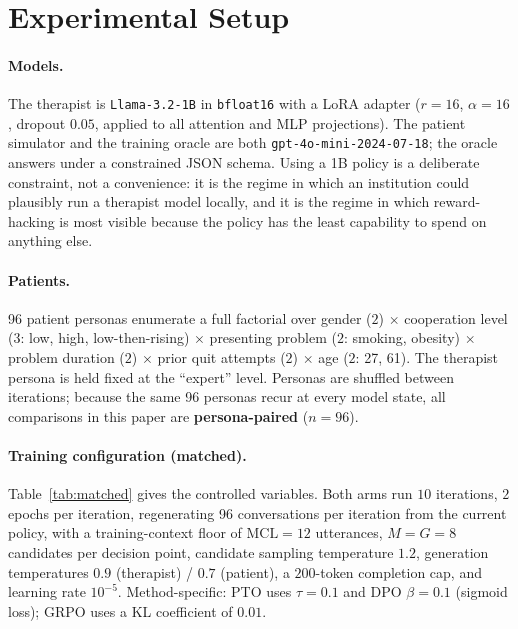 \section{Experimental Setup}
\label{sec:setup}

\paragraph{Models.}
The therapist is \texttt{Llama-3.2-1B} in \texttt{bfloat16} with a LoRA adapter
($r{=}16$, $\alpha{=}16$, dropout $0.05$, applied to all attention and MLP projections).
The patient simulator and the training oracle are both
\texttt{gpt-4o-mini-2024-07-18}; the oracle answers under a constrained JSON schema.
Using a 1B policy is a deliberate constraint, not a convenience: it is the regime in
which an institution could plausibly run a therapist model locally, and it is the regime in
which reward-hacking is most visible because the policy has the least capability to spend
on anything else.

\paragraph{Patients.}
96 patient personas enumerate a full factorial over gender ($2$) $\times$ cooperation level
($3$: low, high, low-then-rising) $\times$ presenting problem ($2$: smoking, obesity)
$\times$ problem duration ($2$) $\times$ prior quit attempts ($2$) $\times$ age
($2$: 27, 61). The therapist persona is held fixed at the ``expert'' level. Personas are
shuffled between iterations; because the same 96 personas recur at every model state, all
comparisons in this paper are \textbf{persona-paired} ($n{=}96$).

\paragraph{Training configuration (matched).}
Table~\ref{tab:matched} gives the controlled variables. Both arms run
$10$ iterations, $2$ epochs per iteration, regenerating 96 conversations per iteration
from the current policy, with a training-context floor of $\mathrm{MCL}=12$ utterances,
$M = G = 8$ candidates per decision point, candidate sampling temperature $1.2$, generation
temperatures $0.9$ (therapist) / $0.7$ (patient), a $200$-token completion cap, and
learning rate $10^{-5}$. Method-specific: PTO uses $\tau=0.1$ and DPO
$\beta=0.1$ (sigmoid loss); GRPO uses a KL coefficient of $0.01$.


